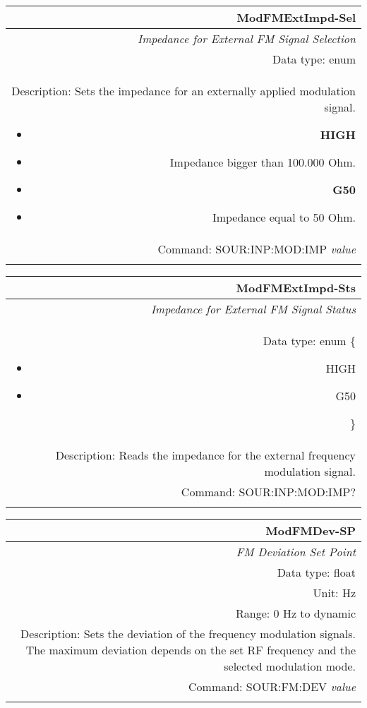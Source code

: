 \documentclass[openany]{article}
\begin{document}
		\begin{tabular}{N}
			\hline
			\bfseries ModFMExtImpd-Sel \\ \hline
			\emph{Impedance for External FM Signal Selection} \\
			Data type: enum \\  
			Description: Sets the impedance for an externally applied modulation signal.\begin{itemize}[noitemsep]
				\small
				\item[] \textbf{HIGH}
                                \item[] Impedance bigger than 100.000 Ohm.
                                \item[] \textbf{G50}
                                \item[] Impedance equal to 50 Ohm.
			\end{itemize} \\
			Command: SOUR:INP:MOD:IMP \emph{value} \\
			\\

		\end{tabular}


		\begin{tabular}{N}
			\hline
			\bfseries ModFMExtImpd-Sts \\ \hline
			\emph{Impedance for External FM Signal Status} \\
			Data type: enum \{\begin{itemize}[noitemsep]
				\small
				\item[] HIGH
				\item[] G50
			\end{itemize}\} \\ 
			Description: Reads the impedance for the external frequency modulation signal. \\
			Command: SOUR:INP:MOD:IMP? \\
			\\

		\end{tabular}


		\begin{tabular}{N}
			\hline
			\bfseries ModFMDev-SP \\ \hline
			\emph{FM Deviation Set Point} \\
			Data type: float \\
			Unit: Hz \\  
			Range: 0 Hz to dynamic \\
			Description: Sets the deviation of the frequency modulation signals. The maximum deviation depends on the set RF frequency and the selected modulation mode. \\
			Command: SOUR:FM:DEV \emph{value} \\
			\\
			
		\end{tabular}
\end{document}
